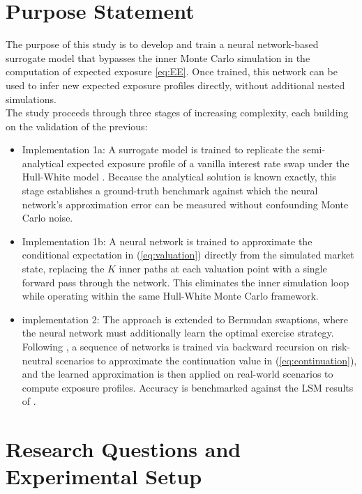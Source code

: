     \newpage
    \section{Purpose Statement}\label{sec:purpose_statement}
    
    The purpose of this study is to develop and train a neural network-based surrogate model that bypasses the inner Monte Carlo simulation in the computation of expected exposure \ref{eq:EE}. Once trained, this network can be used to infer new expected exposure profiles directly, without additional nested simulations.\\ 

    \noindent
    The study proceeds through three stages of increasing complexity, each building on the validation of the previous:
    
    \begin{itemize}
      \item Implementation 1a: A surrogate model is trained to replicate the semi-analytical expected exposure profile of a vanilla interest rate swap under the Hull-White model \cite{jamshidian1989exact}. Because the analytical solution is known exactly, this stage establishes a ground-truth benchmark against which the neural network's approximation error can be measured without confounding Monte Carlo noise.
    
      \item Implementation 1b: A neural network is trained to approximate the conditional expectation in (\ref{eq:valuation}) directly from the simulated market state, replacing the $K$ inner paths at each valuation point with a single forward pass through the network. This eliminates the inner simulation loop while operating within the same Hull-White Monte Carlo framework.
    
      \item implementation 2: The approach is extended to Bermudan swaptions, where the neural network must additionally learn the optimal exercise strategy. Following \cite{andersson2021deep}, a sequence of networks is trained via backward recursion on risk-neutral scenarios to approximate the continuation value in (\ref{eq:continuation}), and the learned approximation is then applied on real-world scenarios to compute exposure profiles. Accuracy is benchmarked against the LSM results of \cite{feng2016efficient}.
    \end{itemize}
    
    
    \section{Research Questions and Experimental Setup}\label{sec:research_questions}
    
